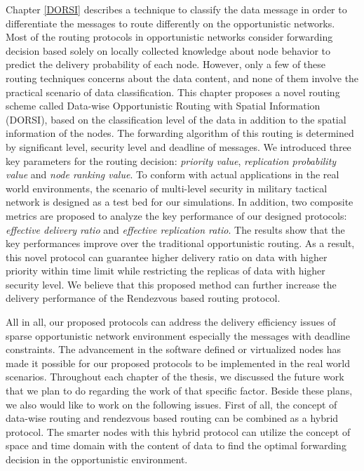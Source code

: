 Chapter \ref{DORSI} describes a technique to classify the data message in order to differentiate the messages to route differently on the opportunistic networks.
Most of the routing protocols in opportunistic networks consider forwarding decision based solely on locally collected knowledge about node behavior to predict the delivery probability of each node. 
However, only a few of these routing techniques concerns about the data content, and none of them involve the practical scenario of data classification. 
This chapter proposes a novel routing scheme called Data-wise Opportunistic Routing with Spatial Information (DORSI), based on the classification level of the data in addition to the spatial information of the nodes. 
The forwarding algorithm of this routing is determined by significant level, security level and deadline of messages. 
We introduced three key parameters for the routing decision: \emph{priority value}, \emph{replication probability value} and \emph{node ranking value}.
To conform with actual applications in the real world environments, the scenario of multi-level security in military tactical network is designed as a test bed for our simulations. 
In addition, two composite metrics are proposed to analyze the key performance of our designed protocols: \emph{effective delivery ratio} and \emph{effective replication ratio}.
The results show that the key performances improve over the traditional opportunistic routing. 
As a result, this novel protocol can guarantee higher delivery ratio on data with higher priority within time limit while restricting the replicas of data with higher security level.
We believe that this proposed method can further increase the delivery performance of the Rendezvous based routing protocol.

All in all, our proposed protocols can address the delivery efficiency issues of sparse opportunistic network environment especially the messages with deadline constraints.
The advancement in the software defined or virtualized nodes has made it possible for our proposed protocols to be implemented in the real world scenarios.
Throughout each chapter of the thesis, we discussed the future work that we plan to do regarding the work of that specific factor.
Beside these plans, we also would like to work on the following issues.
First of all, the concept of data-wise routing and rendezvous based routing can be combined as a hybrid protocol.
The smarter nodes with this hybrid protocol can utilize the concept of space and time domain with the content of data to find the optimal forwarding decision in the opportunistic environment.











